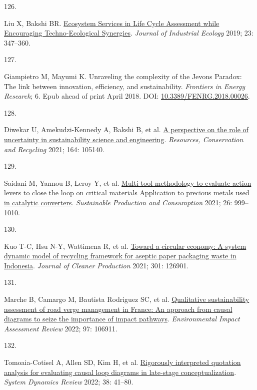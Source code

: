 \documentclass[
  12pt,
  a4paperpaper,
  onecolumn]{article}
\newlength{\cslhangindent}
\newlength{\csllabelwidth}
\newlength{\cslentryspacingunit} %
\newenvironment{CSLReferences}[2] %
 {%
  \setlength{\parindent}{0pt}
  \ifodd #1
  \let\oldpar\par
  \def\par{\hangindent=\cslhangindent\oldpar}
  \fi
  \setlength{\parskip}{#2\cslentryspacingunit}
 }%
 {}
\newcommand{\CSLLeftMargin}[1]{\parbox[t]{\csllabelwidth}{#1}}
\newcommand{\CSLRightInline}[1]{\parbox[t]{\linewidth - \csllabelwidth}{#1}\break}
\begin{document}
\begin{CSLReferences}{0}{0}
\leavevmode{}%
\CSLLeftMargin{126. }%
\CSLRightInline{Liu X, Bakshi BR.
\href{https://doi.org/10.1111/jiec.12755}{Ecosystem {Services} in {Life
Cycle Assessment} while {Encouraging Techno}-{Ecological Synergies}}.
\emph{Journal of Industrial Ecology} 2019; 23: 347--360.}

\leavevmode{}%
\CSLLeftMargin{127. }%
\CSLRightInline{Giampietro M, Mayumi K. Unraveling the complexity of the
{Jevons Paradox}: {The} link between innovation, efficiency, and
sustainability. \emph{Frontiers in Energy Research}; 6. Epub ahead of
print April 2018. DOI:
\href{https://doi.org/10.3389/FENRG.2018.00026}{10.3389/FENRG.2018.00026}.}

\leavevmode{}%
\CSLLeftMargin{128. }%
\CSLRightInline{Diwekar U, Amekudzi-Kennedy A, Bakshi B, et al.
\href{https://doi.org/10.1016/j.resconrec.2020.105140}{A perspective on
the role of uncertainty in sustainability science and engineering}.
\emph{Resources, Conservation and Recycling} 2021; 164: 105140.}

\leavevmode{}%
\CSLLeftMargin{129. }%
\CSLRightInline{Saidani M, Yannou B, Leroy Y, et al.
\href{https://doi.org/10.1016/j.spc.2021.01.010}{Multi-tool methodology
to evaluate action levers to close the loop on critical materials
\textendash{} {Application} to precious metals used in catalytic
converters}. \emph{Sustainable Production and Consumption} 2021; 26:
999--1010.}

\leavevmode{}%
\CSLLeftMargin{130. }%
\CSLRightInline{Kuo T-C, Hsu N-Y, Wattimena R, et al.
\href{https://doi.org/10.1016/j.jclepro.2021.126901}{Toward a circular
economy: {A} system dynamic model of recycling framework for aseptic
paper packaging waste in {Indonesia}}. \emph{Journal of Cleaner
Production} 2021; 301: 126901.}

\leavevmode{}%
\CSLLeftMargin{131. }%
\CSLRightInline{Marche B, Camargo M, Bautista Rodriguez SC, et al.
\href{https://doi.org/10.1016/j.eiar.2022.106911}{Qualitative
sustainability assessment of road verge management in {France}: {An}
approach from causal diagrams to seize the importance of impact
pathways}. \emph{Environmental Impact Assessment Review} 2022; 97:
106911.}

\leavevmode{}%
\CSLLeftMargin{132. }%
\CSLRightInline{Tomoaia-Cotisel A, Allen SD, Kim H, et al.
\href{https://doi.org/10.1002/SDR.1701}{Rigorously interpreted quotation
analysis for evaluating causal loop diagrams in late-stage
conceptualization}. \emph{System Dynamics Review} 2022; 38: 41--80.}


\end{CSLReferences}
\end{document}
